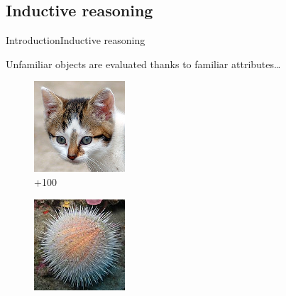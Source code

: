 \subsection{Inductive reasoning}
\begin{frame}{Introduction}{Inductive reasoning}

Unfamiliar objects are evaluated thanks to familiar attributes\ldots
\vfill
\begin{figure}[ht]
\begin{minipage}[b]{0.2\linewidth}
\centering
\includegraphics[width=\textwidth]{img/introduction/kitten.png}
\\{\color{green}+100}
\end{minipage}
\hfill
\begin{minipage}[b]{0.2\linewidth}
\centering
\includegraphics[width=\textwidth]{img/introduction/urchin.png}

\end{minipage}
\end{figure}
\end{frame}
